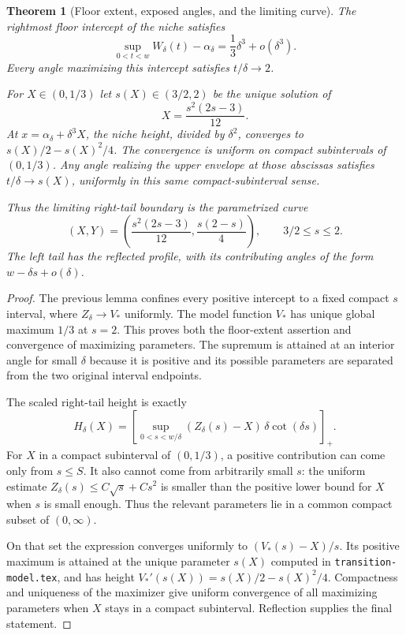\documentclass[11pt]{article}
\newtheorem{theorem}{Theorem}
\begin{document}
\begin{theorem}[Floor extent, exposed angles, and the limiting curve]
The rightmost floor intercept of the niche satisfies
\[
 \sup_{0<t<w}W_\delta(t)-\alpha_\delta=\frac13\delta^3+o(\delta^3).
\]
Every angle maximizing this intercept satisfies $t/\delta\to2$.

For $X\in(0,1/3)$ let $s(X)\in(3/2,2)$ be the unique solution of
\[
 X=\frac{s^2(2s-3)}{12}.
\]
At $x=\alpha_\delta+\delta^3X$, the niche height, divided by $\delta^2$, converges to $s(X)/2-s(X)^2/4$. The convergence is uniform on compact subintervals of $(0,1/3)$. Any angle realizing the upper envelope at those abscissas satisfies $t/\delta\to s(X)$, uniformly in this same compact-subinterval sense.

Thus the limiting right-tail boundary is the parametrized curve
\[
 \boxed{(X,Y)=\left(\frac{s^2(2s-3)}{12},\frac{s(2-s)}4\right),\qquad3/2\le s\le2.}
\]
The left tail has the reflected profile, with its contributing angles of the form $w-\delta s+o(\delta)$.
\end{theorem}
\begin{proof}
The previous lemma confines every positive intercept to a fixed compact $s$ interval, where $Z_\delta\to V_*$ uniformly. The model function $V_*$ has unique global maximum $1/3$ at $s=2$. This proves both the floor-extent assertion and convergence of maximizing parameters. The supremum is attained at an interior angle for small $\delta$ because it is positive and its possible parameters are separated from the two original interval endpoints.

The scaled right-tail height is exactly
\[
 H_\delta(X)=\left[\sup_{0<s<w/\delta}(Z_\delta(s)-X)\,\delta\cot(\delta s)\right]_+.
\]
For $X$ in a compact subinterval of $(0,1/3)$, a positive contribution can come only from $s\le S$. It also cannot come from arbitrarily small $s$: the uniform estimate $Z_\delta(s)\le C\sqrt s+Cs^2$ is smaller than the positive lower bound for $X$ when $s$ is small enough. Thus the relevant parameters lie in a common compact subset of $(0,\infty)$.

On that set the expression converges uniformly to $(V_*(s)-X)/s$. Its positive maximum is attained at the unique parameter $s(X)$ computed in \texttt{transition-model.tex}, and has height $V_*'(s(X))=s(X)/2-s(X)^2/4$. Compactness and uniqueness of the maximizer give uniform convergence of all maximizing parameters when $X$ stays in a compact subinterval. Reflection supplies the final statement.
\end{proof}
\end{document}
